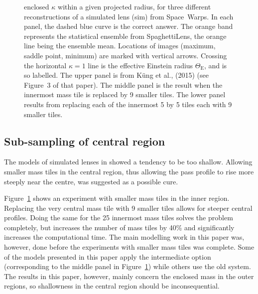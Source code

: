 \documentclass[fleqn,usenatbib]{mnras}
\newcommand{\figref}[1]{\ref{fig:#1}}
\newcommand{\ER}{$\Theta_{\text{E}}$} %
\begin{document}
\begin{figure}
{    enclosed $\kappa$ within a given projected radius, for three
    different reconstructions of a simulated lens (sim) from
    Space~Warps.  In each panel, the dashed blue curve is the correct
    answer.  The orange band represents the statistical ensemble from
    SpaghettiLens, the orange line being the ensemble mean.  Locations of
    images (maximum, saddle point, minimum) are marked with vertical
    arrows.  Crossing the horizontal $\kappa=1$ line is the effective
    Einstein radius \ER, and is so labelled. The upper panel is from
    K\"ung et al., (2015) (see Figure~3 of that paper).  The middle
    panel is the result when the innermost mass tile is replaced by 9
    smaller tiles.  The lower panel results from replacing each of the
    innermost 5 by 5 tiles each with 9 smaller tiles.}
  \label{fig:subsampling}
\end{figure}

\subsection{Sub-sampling of central region}\label{subsec:hires}

The models of simulated lenses in \cite{2015MNRAS.447.2170K} showed a
tendency to be too shallow.  Allowing smaller mass tiles in the
central region, thus allowing the pass profile to rise more steeply
near the centre, was suggested as a possible cure.

Figure~\figref{subsampling} shows an experiment with smaller mass
tiles in the inner region.  Replacing the very central mass tile with
9 smaller tiles allows for steeper central profiles.  Doing the same
for the 25 innermost mass tiles solves the problem completely, but
increases the number of mass tiles by 40\% and significantly increases
the computational time.
The main modelling work in this paper was, however, done before the
experiments with smaller mass tiles was complete.  Some of the models
presented in this paper apply the intermediate option (corresponding
to the middle panel in Figure~\figref{subsampling}) while others use
the old system.  The results in this paper, however, mainly concern
the enclosed mass in the outer regions, so shallowness in the central
region should be inconsequential.
\end{document}
